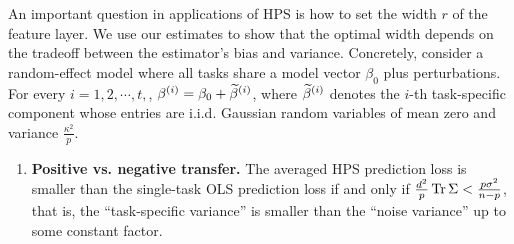 \begin{example}
\label{ex_same_cov}
An important question in applications of HPS is how to set the width $r$ of the feature layer.
We use our estimates to show that the optimal width depends on the tradeoff between the estimator's bias and variance.
Concretely, consider a random-effect model where all tasks share a model vector $\beta_0$ plus perturbations.
For every $i=1,2,\cdots, t,$, $\beta^{(i)} = \beta_0 + \widetilde \beta^{(i)}$, where $\widetilde \beta^{(i)}$ denotes the $i$-th task-specific component whose entries are i.i.d. Gaussian random variables of mean zero and variance $\frac {\kappa^2} p$.

\begin{claim}
\begin{enumerate}
	\item {\bf Positive vs. negative transfer.} The averaged HPS prediction loss is smaller than the single-task OLS prediction loss if and only if $\frac{d^2}{p}\operatorname{Tr} \Sigma  < \frac{p\sigma^2 }{n - p}$, that is, the ``task-specific variance'' is smaller than the ``noise variance'' up to some constant factor.
	

\end{enumerate}
\end{claim}
\end{example}
